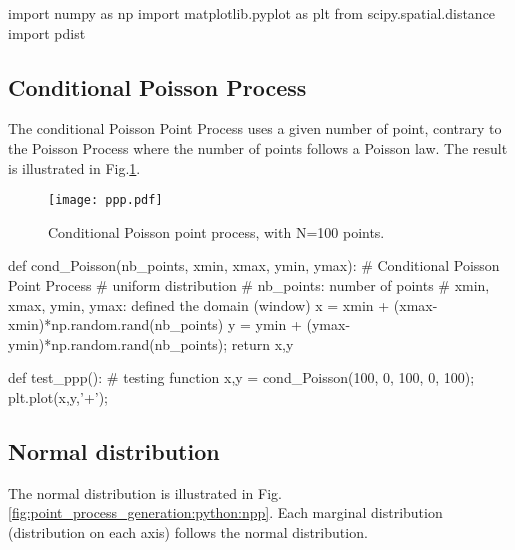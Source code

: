 \def\QRCODE{TB_IPR_TUT.IMG.point_processes_generation_pythonqrcode.png}
\def\QRPAGE{http://www.iptutorials.science/tree/master/TB_IPR/TUT.IMG.point_processes_generation/python}

\begin{python}
import numpy as np
import matplotlib.pyplot as plt
from scipy.spatial.distance import pdist
\end{python}

\vspace*{-8pt}

\subsection{Conditional Poisson Process}
The conditional Poisson Point Process uses a given number of point, contrary to the Poisson Process where the number of points follows a Poisson law. The result is illustrated in Fig.\ref{fig:point_process_generation:python:ppp}.

\vspace*{-8pt}

\begin{figure}[htbp]
\centering\caption{Conditional Poisson point process, with N=100 points.}%
 \texttt{[image: ppp.pdf]}%
 \label{fig:point_process_generation:python:ppp}%
\end{figure}

\vspace*{-8pt}

\begin{python}
def cond_Poisson(nb_points, xmin, xmax, ymin, ymax):
    # Conditional Poisson Point Process
    # uniform distribution
    # nb_points: number of points
    # xmin, xmax, ymin, ymax: defined the domain (window)
    x = xmin + (xmax-xmin)*np.random.rand(nb_points)
    y = ymin + (ymax-ymin)*np.random.rand(nb_points);
    return x,y

def test_ppp():
    # testing function
    x,y = cond_Poisson(100, 0, 100, 0, 100);
    plt.plot(x,y,'+');
\end{python}

\subsection{Normal distribution}
The normal distribution is illustrated in Fig.\ref{fig:point_process_generation:python:npp}. Each marginal distribution (distribution on each axis) follows the normal distribution.

